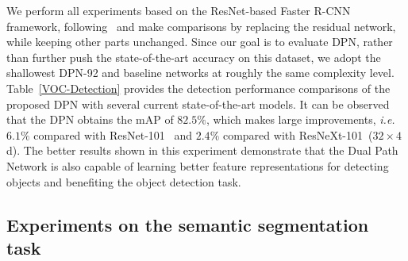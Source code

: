 \documentclass{article}
\begin{document}
We perform all experiments based on the ResNet-based Faster R-CNN framework, following~\cite{he2016deep} and make comparisons by replacing the residual network, while keeping other parts unchanged. Since our goal is to evaluate DPN, rather than further push the state-of-the-art accuracy on this dataset, we adopt the shallowest DPN-92 and baseline networks at roughly the same complexity level. Table~\ref{VOC-Detection} provides the detection performance comparisons of the proposed DPN with several current state-of-the-art models. It can be observed that the DPN obtains the mAP of $82.5\%$, which makes large improvements, \emph{i.e.} $6.1\%$ compared with ResNet-101~\cite{ren2015faster} and $2.4\%$ compared with ResNeXt-101~($32\times4$d). The better results shown in this experiment demonstrate that the Dual Path Network is also capable of learning better feature representations for detecting objects and benefiting the object detection task.


\subsection{Experiments on the semantic segmentation task}
\end{document}
